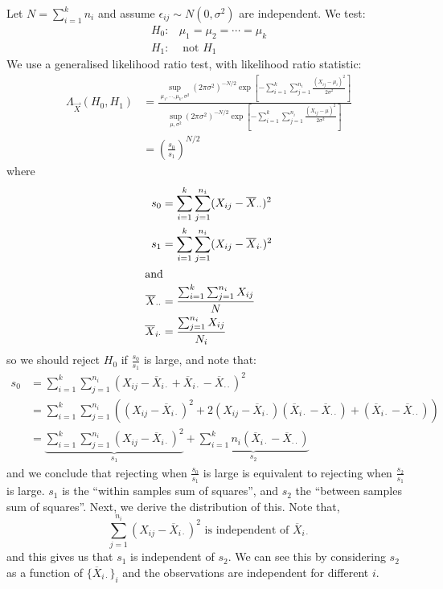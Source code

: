 \documentclass[../Main.tex]{subfiles}
\begin{document}
Let $N = \sum_{i=1}^{k} n_i$ and assume $\epsilon_{ij} \sim N(0, \sigma^2)$ are independent. We test:
\begin{align*}
    H_0: & \mu_1 = \mu_2 = \cdots = \mu_k \\
    H_1: & \text{ not $H_1$}
\end{align*}
We use a generalised likelihood ratio test, with likelihood ratio statistic:
\begin{align*}
    \Lambda_{\vec{X}}(H_0, H_1) &= \frac{\sup_{\mu_1, \cdots, \mu_k, \sigma^2} (2\pi\sigma^2)^{-N / 2} \exp\left[-\sum_{i=1}^{k} \sum_{j=1}^{n_i} \frac{(X_{ij} - \mu_i)^2}{2\sigma^2}\right]}{\sup_{\mu, \sigma^2} (2\pi\sigma^2)^{-N / 2} \exp\left[-\sum_{i=1}^{k} \sum_{j=1}^{n_i} \frac{(X_{ij} - \mu)^2}{2\sigma^2}\right]} \\
    &= \left(\frac{s_0}{s_1}\right)^{N/2}
\end{align*}
where
\begin{align*}
    s_0 &= \sum_{i=1}^k \sum_{j=1}^{n_i} (X_{ij} - \overline{X}_{\cdot\cdot})^2 \\
    s_1 &= \sum_{i=1}^k \sum_{j=1}^{n_i} (X_{ij} - \overline{X}_{i\cdot})^2 \\
\intertext{and}
    \overline{X}_{\cdot\cdot} &= \frac{\sum_{i=1}^k \sum_{j=1}^{n_i} X_{ij}}{N} \\
    \overline{X}_{i\cdot} &= \frac{\sum_{j=1}^{n_i} X_{ij}}{N_i}
\end{align*}
so we should reject $H_0$ if $\frac{s_0}{s_1}$ is large, and note that:
\begin{align*}
    s_0 &= \sum_{i=1}^k \sum_{j=1}^{n_i} (X_{ij} - \overline{X}_{i\cdot} + \overline{X}_{i\cdot} - \overline{X}_{\cdot\cdot})^2 \\
    &= \sum_{i=1}^k \sum_{j=1}^{n_i} \left(\left(X_{ij} - \overline{X}_{i\cdot}\right)^2 + 2\left(X_{ij} - \overline{X}_{i\cdot}\right)\left(\overline{X}_{i\cdot} - \overline{X}_{\cdot\cdot}\right) + \left(\overline{X}_{i\cdot} - \overline{X}_{\cdot\cdot}\right)\right) \\
    &= \underbrace{\sum_{i=1}^k \sum_{j=1}^{n_i} \left(X_{ij} - \overline{X}_{i\cdot}\right)^2}_{s_1} + \underbrace{\sum_{i=1}^{k} n_i \left(\overline{X}_{i\cdot} - \overline{X}_{\cdot\cdot}\right)}_{s_2}
\end{align*}
and we conclude that rejecting when $\frac{s_0}{s_1}$ is large is equivalent to rejecting when $\frac{s_2}{s_1}$ is large. $s_1$ is the ``within samples sum of squares'', and $s_2$ the ``between samples sum of squares''. Next, we derive the distribution of this. Note that,
\begin{equation*}
    \sum_{j=1}^{n_i} \left(X_{ij} - \overline{X}_{i\cdot}\right)^2 \text{ is independent of $\overline{X}_{i\cdot}$}
\end{equation*}
and this gives us that $s_1$ is independent of $s_2$. We can see this by considering $s_2$ as a function of $\{\overline{X}_{i\cdot}\}_i$ and the observations are independent for different $i$.
\end{document}
